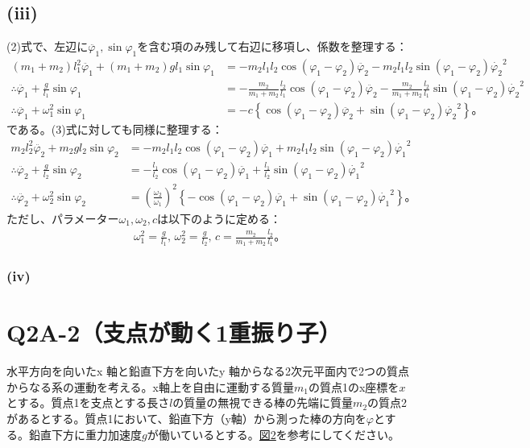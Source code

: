   \subsection*{(iii)}
  (2)式で、左辺に$\ddot{\varphi_1},\sin\varphi_1$を含む項のみ残して右辺に移項し、係数を整理する：
  \begin{align*}
    (m_1+m_2)l_1^2\ddot{\varphi_1}+(m_1+m_2)gl_1\sin\varphi_1&=-m_2l_1l_2\cos(\varphi_1-\varphi_2)\ddot{\varphi_2}-m_2l_1l_2\sin(\varphi_1-\varphi_2)\dot{\varphi_2}^2\\
    \therefore \ddot{\varphi_1}+\frac{g}{l_1}\sin\varphi_1&=-\frac{m_2}{m_1+m_2}\frac{l_2}{l_1}\cos(\varphi_1-\varphi_2)\ddot{\varphi_2}-\frac{m_2}{m_1+m_2}\frac{l_2}{l_1}\sin(\varphi_1-\varphi_2)\dot{\varphi_2}^2\\
    \therefore \ddot{\varphi_1}+\omega_1^2\sin\varphi_1&=-c\left\{\cos(\varphi_1-\varphi_2)\ddot{\varphi_2}+\sin(\varphi_1-\varphi_2)\dot{\varphi_2}^2\right\}\tag{4}。
  \end{align*}
  である。(3)式に対しても同様に整理する：
  \begin{align*}
    m_2l_2^2\ddot{\varphi_2}+m_2gl_2\sin\varphi_2&=-m_2l_1l_2\cos(\varphi_1-\varphi_2)\ddot{\varphi_1}+m_2l_1l_2\sin(\varphi_1-\varphi_2)\dot{\varphi_1}^2\\
    \therefore \ddot{\varphi_2}+\frac{g}{l_2}\sin\varphi_2&=-\frac{l_1}{l_2}\cos(\varphi_1-\varphi_2)\ddot{\varphi_1}+\frac{l_1}{l_2}\sin(\varphi_1-\varphi_2)\dot{\varphi_1}^2\\
    \therefore \ddot{\varphi_2}+\omega_2^2\sin\varphi_2&=\left(\frac{\omega_2}{\omega_1}\right)^2\left\{-\cos(\varphi_1-\varphi_2)\ddot{\varphi_1}+\sin(\varphi_1-\varphi_2)\dot{\varphi_1}^2\right\}\tag{5}。
  \end{align*}
  ただし、パラメーター$\omega_1,\omega_2,c$は以下のように定める：
  \begin{align*}
    \omega_1^2=\frac{g}{l_1},\,\omega_2^2=\frac{g}{l_2},\,c=\frac{m_2}{m_1+m_2}\frac{l_2}{l_1}。\tag{6}
  \end{align*}
  \subsubsection*{(iv)}

  \section{Q2A-2（支点が動く1重振り子）}
  水平方向を向いたx 軸と鉛直下方を向いたy 軸からなる2次元平面内で2つの質点からなる系の運動を考える。x軸上を自由に運動する質量$m_1$の質点1のx座標を$x$とする。質点1を支点とする長さ$l$の質量の無視できる棒の先端に質量$m_2$の質点2があるとする。質点1において、鉛直下方（y軸）から測った棒の方向を$\varphi$とする。鉛直下方に重力加速度$g$が働いているとする。\hyperref[fig:2]{図2}を参考にしてください。

